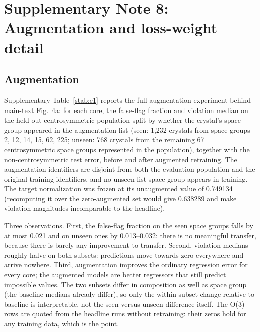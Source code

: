 \section*{Supplementary Note 8: Augmentation and loss-weight detail}

\subsection*{Augmentation}

Supplementary Table~\ref{stab:e1} reports the full augmentation experiment behind main-text Fig.~4a: for each core, the false-flag fraction and violation median on the held-out centrosymmetric population split by whether the crystal's space group appeared in the augmentation list (seen: 1,232 crystals from space groups 2, 12, 14, 15, 62, 225; unseen: 768 crystals from the remaining 67 centrosymmetric space groups represented in the population), together with the non-centrosymmetric test error, before and after augmented retraining. The augmentation identifiers are disjoint from both the evaluation population and the original training identifiers, and no unseen-list space group appears in training. The target normalization was frozen at its unaugmented value of 0.749134 (recomputing it over the zero-augmented set would give 0.638289 and make violation magnitudes incomparable to the headline).

Three observations. First, the false-flag fraction on the seen space groups falls by at most 0.021 and on unseen ones by 0.013--0.032: there is no meaningful transfer, because there is barely any improvement to transfer. Second, violation medians roughly halve on both subsets: predictions move towards zero everywhere and arrive nowhere. Third, augmentation improves the ordinary regression error for every core; the augmented models are better regressors that still predict impossible values. The two subsets differ in composition as well as space group (the baseline medians already differ), so only the within-subset change relative to baseline is interpretable, not the seen-versus-unseen difference itself. The O(3) rows are quoted from the headline runs without retraining: their zeros hold for any training data, which is the point.

